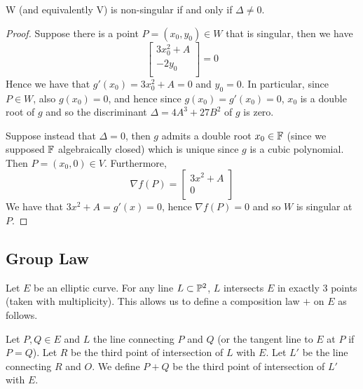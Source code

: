 \begin{proposition}
	\label{prop:singular-determinant}
	W (and equivalently V)
	is non-singular if and only if $\Delta \neq 0$.
\end{proposition}
\begin{proof}
	Suppose there is a point $P = (x_0, y_0) \in W$ that is singular,
	then we have
	\begin{equation*}
		\begin{bmatrix}
			3x_0^2 + A\\
			-2y_0\\
		\end{bmatrix} = 0
	\end{equation*}
	Hence we have that $g'(x_0) = 3x_0^2 + A = 0$ and $y_0 = 0$.
	In particular, since $P \in W$, also 
	$g(x_0) = 0$, and hence since $g(x_0) = g'(x_0) = 0$,
	$x_0$ is a double root of $g$ and so the discriminant
	$\Delta = 4A^3 + 27B^2$ of $g$ is zero.

	Suppose instead that $\Delta = 0$, then $g$ admits a double root
	$x_0 \in \mathbb{F}$ (since we supposed $\mathbb{F}$ algebraically closed)
	which is unique since $g$ is a cubic polynomial.
	Then $P = (x_0, 0) \in V$.
	Furthermore,
	\begin{equation*}
		\nabla f(P) =
		\begin{bmatrix}
			3x^2 + A\\
			0\\
		\end{bmatrix}
	\end{equation*}
	We have that $3x^2 + A = g'(x) = 0$, hence $\nabla f(P) = 0$
	and so $W$ is singular at $P$.
\end{proof}

\subsection{Group Law}

Let $E$ be an elliptic curve. For any line $L \subset \mathbb{P}^2$, $L$ intersects
$E$ in exactly 3 points (taken with multiplicity). This allows us
to define a composition law $+$ on $E$ as
follows.

\begin{definition}
	Let $P, Q \in E$ and $L$ the line connecting $P$ and $Q$ (or the tangent line
	to $E$ at $P$ if $P = Q$). Let $R$ be the third point of intersection of $L$
	with $E$. Let $L'$ be the line connecting $R$ and $O$. We define $P + Q$
	be the third point of intersection of $L'$ with $E$.
\end{definition}

